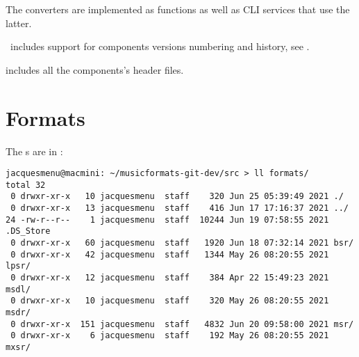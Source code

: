 The converters are implemented as functions as well as CLI services that use the latter.

\mf\ includes support for components versions numbering and history, see .

 includes all the components's header files.


\section{Formats}

The \format s are in :
\begin{lstlisting}[language=Terminal]
jacquesmenu@macmini: ~/musicformats-git-dev/src > ll formats/
total 32
 0 drwxr-xr-x   10 jacquesmenu  staff    320 Jun 25 05:39:49 2021 ./
 0 drwxr-xr-x   13 jacquesmenu  staff    416 Jun 17 17:16:37 2021 ../
24 -rw-r--r--    1 jacquesmenu  staff  10244 Jun 19 07:58:55 2021 .DS_Store
 0 drwxr-xr-x   60 jacquesmenu  staff   1920 Jun 18 07:32:14 2021 bsr/
 0 drwxr-xr-x   42 jacquesmenu  staff   1344 May 26 08:20:55 2021 lpsr/
 0 drwxr-xr-x   12 jacquesmenu  staff    384 Apr 22 15:49:23 2021 msdl/
 0 drwxr-xr-x   10 jacquesmenu  staff    320 May 26 08:20:55 2021 msdr/
 0 drwxr-xr-x  151 jacquesmenu  staff   4832 Jun 20 09:58:00 2021 msr/
 0 drwxr-xr-x    6 jacquesmenu  staff    192 May 26 08:20:55 2021 mxsr/
\end{lstlisting}

